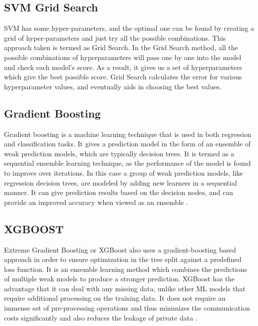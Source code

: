 \subsection{SVM Grid Search}
SVM has some hyper-parameters, and the optimal one can be found by creating a grid of hyper-parameters and just try all the possible combinations. This approach taken is termed as Grid Search. In the Grid Search method, all the possible combinations of hyperparameters will pass one by one into the model and check each model's score. As a result, it gives us a set of hyperparameters which give the best possible score.  Grid Search calculates the error for various hyperparameter values, and eventually aids in choosing the best values.

\subsection{Gradient Boosting}
Gradient boosting is a machine learning technique that is used in both regression and classification tasks. It gives a prediction model in the form of an ensemble of weak prediction models, which are typically decision trees. It is termed as a sequential ensemble learning technique, as the performance of the model is found to improve over iterations. In this case a group of weak prediction models, like regression decision trees, are modeled by adding new learners in a sequential manner. It can give prediction results based on the decision nodes, and can provide an improved accuracy when viewed as an ensemble \cite{ar25}. 

\subsection{XGBOOST}
Extreme Gradient Boosting or XGBoost also uses a gradient-boosting based approach in order to ensure optimization in the tree split against a predefined loss function.  It is an ensemble learning method which combines the predictions of multiple weak models to produce a stronger prediction. XGBoost has the advantage that it can deal with any missing data, unlike other ML models that require additional processing on the training data. It does not require an immense set of pre-processing operations and thus minimizes the communication costs significantly and also reduces the leakage of  private data \cite{ar26}. 

